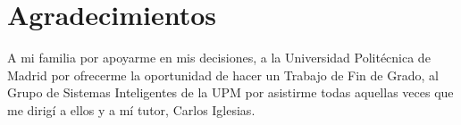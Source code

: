\cleardoublepage
{}
\chapter*{Agradecimientos}
A mi familia por apoyarme en mis decisiones, a la Universidad Politécnica de Madrid por ofrecerme la oportunidad de hacer un Trabajo de Fin de Grado, al Grupo de Sistemas Inteligentes de la UPM por asistirme todas aquellas veces que me dirigí a ellos y a mí tutor, Carlos Iglesias.
